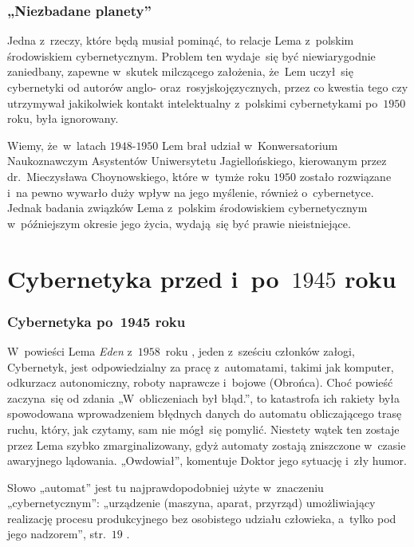 \documentclass[10pt,t]{beamer}
\begin{document}
\begin{frame}
  \frametitle{„Niezbadane planety”}


  Jedna z~rzeczy, które będą musiał pominąć, to relacje Lema z~polskim
  środowiskiem cybernetycznym. Problem ten wydaje~się być niewiarygodnie
  zaniedbany, zapewne w~skutek milczącego założenia, że~Lem uczył~się
  cybernetyki od autorów anglo- oraz~rosyjskojęzycznych, przez co
  kwestia tego czy utrzymywał jakikolwiek kontakt intelektualny
  z~polskimi cybernetykami po~$1950$ roku, była ignorowany.

  Wiemy, że~w~latach $1948\text{-}1950$ Lem brał udział w~Konwersatorium
  Naukoznawczym Asystentów Uniwersytetu Jagiellońskiego, kierowanym
  przez
  {dr.~Mieczysława Choynowskiego}, które w~tymże roku $1950$ zostało
  rozwiązane i~na pewno wywarło duży wpływ na jego myślenie,
  również o~cybernetyce. Jednak badania związków Lema z~polskim środowiskiem
  cybernetycznym w~późniejszym okresie jego życia, wydają~się być prawie
  nieistniejące.

\end{frame}









\section{Cybernetyka przed i~po~$1945$ roku}


\begin{frame}
  \frametitle{Cybernetyka po~1945 roku}


  W~powieści Lema \textit{Eden} z~$1958$~roku
  \parencite{Lem-Eden-Pub-2019}, jeden z~sześciu członków
  załogi, Cybernetyk, jest odpowiedzialny za pracę z~automatami, takimi
  jak komputer, odkurzacz autonomiczny, roboty naprawcze i~bojowe
  (Obrońca). Choć powieść zaczyna~się od zdania „W~obliczeniach był błąd.”,
  to katastrofa ich rakiety była spowodowana wprowadzeniem błędnych danych
  do automatu obliczającego trasę ruchu, który, jak czytamy, sam nie
  mógł~się pomylić. Niestety wątek ten zostaje przez Lema szybko
  zmarginalizowany, gdyż automaty zostają zniszczone w~czasie awaryjnego
  lądowania. „Owdowiał”, komentuje Doktor jego sytuację i~zły humor.

  Słowo „automat” jest tu najprawdopodobniej użyte w~znaczeniu
  „cybernetycznym”: „urządzenie (maszyna, aparat, przyrząd)
  umożliwiający realizację procesu produkcyjnego bez osobistego udziału
  człowieka, a~tylko pod jego nadzorem”, str.~$19$
  \parencite{Szylejko-Szylejko-Cybernetyka-bez-matematyki-Pub-1977}.

\end{frame}
\end{document}

